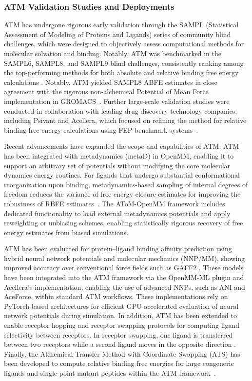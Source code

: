 \documentclass[9pt,bestpractices]{livecoms}
\begin{document}
\subsubsection{ATM Validation Studies and Deployments}

ATM has undergone rigorous early validation through the SAMPL (Statistical Assessment of Modeling of Proteins and Ligands) series of community blind challenges, which were designed to objectively assess computational methods for molecular solvation and binding. Notably, ATM was benchmarked in the SAMPL6, SAMPL8, and SAMPL9 blind challenges, consistently ranking among the top-performing methods for both absolute and relative binding free energy calculations \cite{wu2021alchemical,azimi2022application,khuttan2023taming}. Notably, ATM yielded SAMPL8 ABFE estimates in close agreement with the rigorous non-alchemical Potential of Mean Force implementation in GROMACS~\cite{azimi2022application}. Further large-scale validation studies were conducted in collaboration with leading drug discovery technology companies, including Psivant and Acellera, which focused on refining the method for relative binding free energy calculations using FEP benchmark systems~\cite{chen2024performance,sabanes2023validation}.

Recent advancements have expanded the scope and capabilities of ATM. ATM has been integrated with metadynamics (metaD) in OpenMM, enabling it to support an arbitrary set of potentials without modifying the core molecular dynamics energy routines. For ligands that undergo substantial conformational reorganization upon binding, metadynamics-based sampling of internal degrees of freedom reduces the variance of free energy closure estimates for improving the robustness of RBFE estimates~\cite{khuttan2024make}. The AToM-OpenMM framework includes dedicated functionality to load external metadynamics potentials and apply reweighting or unbiasing schemes, enabling statistically rigorous recovery of free energy estimates from biased simulations.

ATM has been evaluated for protein–ligand binding affinity prediction using hybrid neural network potentials and molecular mechanics (NNP/MM), showing improved accuracy over conventional force fields such as GAFF2 \cite{sabanes2024enhancing}. These models have been integrated into the ATM framework via the OpenMM-ML plugin and Acellera's implementation, enabling the use of advanced NNPs, such as ANI and AceForce, within standard ATM workflows. These implementations rely on PyTorch-based architectures for efficient GPU-accelerated evaluation of neural network potentials during simulation. In addition, ATM has been extended to enable receptor hopping and receptor swapping protocols for computing ligand selectivity between receptors. In receptor swapping, one ligand is transferred between two receptors while a second ligand moves in the opposite direction \cite{azimi2024selectivity}. Finally, the Alchemical Transfer Method with Coordinate Swapping (ATS) has been developed to compute relative binding free energies for large congeneric ligands and single-point mutant peptides within the ATM framework~\cite{gallicchio2025mutants}.
\end{document}

